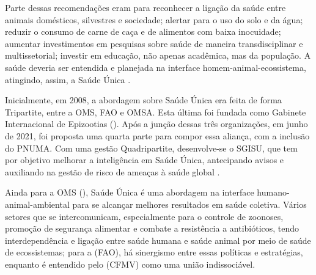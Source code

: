 \indent Parte dessas recomendações eram para reconhecer a ligação da saúde entre animais domésticos, silvestres e sociedade; alertar para o uso do solo e da água; reduzir o consumo de carne de caça e de alimentos com baixa inocuidade; aumentar investimentos em pesquisas sobre saúde de maneira transdisciplinar e multissetorial; investir em educação, não apenas acadêmica, mas da população. A saúde deveria ser entendida e planejada na interface homem-animal-ecossistema, atingindo, assim, a Saúde Única \cite{ManhattanPrinciples2004}.

\indent Inicialmente, em 2008, a abordagem sobre Saúde Única era feita de forma Tripartite, entre a \acrfull{OMS}, \acrfull{FAO} e \acrfull{OMSA}. Esta última foi fundada como Gabinete Internacional de Epizootias (). Após a junção dessas três organizações, em junho de 2021, foi proposta uma quarta parte para compor essa aliança, com a inclusão do \acrfull{PNUMA}. Com uma gestão Quadripartite, desenvolve-se o \acrfull{SGISU}, que tem por objetivo melhorar a inteligência em Saúde Única, antecipando avisos e auxiliando na gestão de risco de ameaças à saúde global \cite{S1Quadripartite}.


\indent Ainda para a \acrshort{OMS} (\citeyear{OMS2024S1}), Saúde Única é uma abordagem na interface humano-animal-ambiental para se alcançar melhores resultados em saúde coletiva. Vários setores que se intercomunicam, especialmente para o controle de zoonoses, promoção de segurança alimentar e combate a resistência a antibióticos, tendo interdependência e ligação entre saúde humana e saúde animal por meio de saúde de ecossistemas; para a  (\acrshort{FAO}), há sinergismo entre essas políticas e estratégias, enquanto é entendido pelo  (\acrshort{CFMV}) como uma união indissociável.


